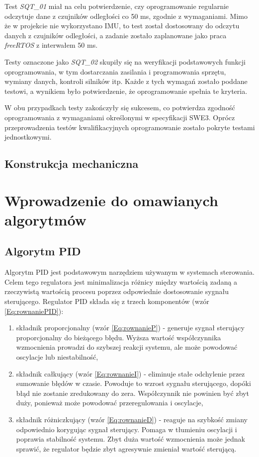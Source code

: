 \documentclass[12pt,twoside]{article}
\begin{document}
Test \textit{SQT\_01} miał na celu potwierdzenie, czy oprogramowanie regularnie odczytuje dane z czujników odległości co 50 ms, zgodnie z wymaganiami. Mimo że w projekcie nie wykorzystano IMU, to test został dostosowany do odczytu danych z czujników odległości, a zadanie zostało zaplanowane jako praca \textit{freeRTOS} \cite{freeRTOS} z interwałem 50 ms.

Testy oznaczone jako \textit{SQT\_02} skupiły się na weryfikacji podstawowych funkcji oprogramowania, w tym dostarczania zasilania i programowania sprzętu, wymiany danych, kontroli silników itp. Każde z tych wymagań zostało poddane testowi, a wynikiem było potwierdzenie, że oprogramowanie spełnia te kryteria.

W obu przypadkach testy zakończyły się sukcesem, co potwierdza zgodność oprogramowania z wymaganiami określonymi w specyfikacji SWE3. Oprócz przeprowadzenia testów kwalifikacyjnych oprogramowanie zostało pokryte testami jednostkowymi.

\clearpage

\subsection{Konstrukcja mechaniczna}


\section{Wprowadzenie do omawianych algorytmów}

\subsection{Algorytm PID}
Algorytm PID \cite{PID} jest podstawowym narzędziem używanym w systemach sterowania. Celem tego regulatora jest minimalizacja różnicy między wartością zadaną a rzeczywistą wartością procesu poprzez odpowiednie dostosowanie sygnału sterującego. Regulator PID składa się z trzech komponentów (wzór \ref{Eq:rownaniePID}):



\begin{enumerate}[label=\alph*), leftmargin=1.25cm]
	\item składnik proporcjonalny (wzór \ref{Eq:rownanieP}) - generuje sygnał sterujący proporcjonalny do bieżącego błędu. Wyższa wartość współczynnika wzmocnienia prowadzi do szybszej reakcji systemu, ale może powodować oscylacje lub niestabilność,
	
	\item składnik całkujący (wzór \ref{Eq:rownanieI}) - eliminuje stałe odchylenie przez sumowanie błędów w czasie. Powoduje to wzrost sygnału sterującego, dopóki błąd nie zostanie zredukowany do zera. Współczynnik nie powinien być zbyt duży, ponieważ może powodować przeregulowania i oscylacje,
	
	\item składnik różniczkujący (wzór \ref{Eq:rownanieD}) - reaguje na szybkość zmiany odpowiednio korygując sygnał sterujący. Pomaga w tłumieniu oscylacji i poprawia stabilność systemu. Zbyt duża wartość wzmocnienia może jednak sprawić, że regulator będzie zbyt agresywnie zmieniał wartość sterującą.
\end{enumerate}
\end{document}
